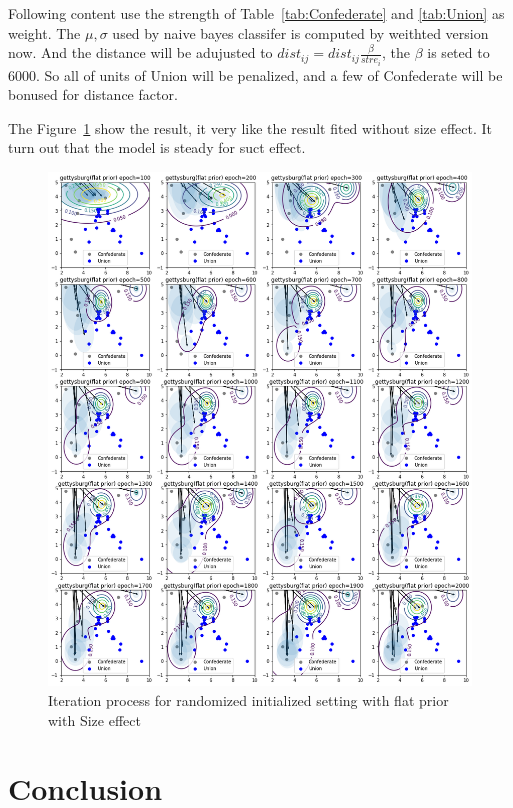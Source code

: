 \documentclass{article}
\begin{document}
Following content use the strength of Table~\ref{tab:Confederate} and \ref{tab:Union} as weight.
The $\mu,\sigma$ used by naive bayes classifer is computed by weithted version now.
And the distance will be adujusted to $dist_{ij} = dist_{ij} \frac{\beta}{stre_i}$, the $\beta$
is seted to $6000$. So all of units of Union will be penalized, 
and a few of Confederate will be bonused for distance factor.

The Figure~\ref{fig:gettysburgInitTwo} show the result, it very like the result fited without size effect. 
It turn out that the model is steady for suct effect.

\begin{figure}[h]
\includegraphics[width=0.99\linewidth]{gettysburg-init2.png}
\caption{Iteration process for randomized initialized setting with flat prior with Size effect}
\label{fig:gettysburgInitTwo}
\end{figure}


\section{Conclusion}
\end{document}
